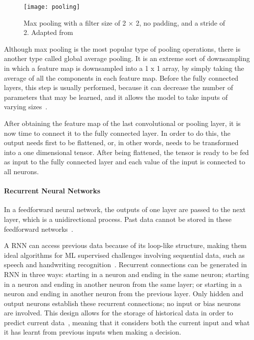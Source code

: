 \begin{figure}[htbp]
    \centering
    \texttt{[image: pooling]}
    \caption{Max pooling with a filter size of 2 × 2, no padding, and a stride of 2. Adapted from~\cite{Yamashita2018ConvolutionalRadiology}}
    \label{fig:pooling}
\end{figure}

Although max pooling is the most popular type of pooling operations, there is another type called global average pooling. It is an extreme sort of downsampling in which a feature map is downsampled into a 1 x 1 array, by simply taking the average of all the components in each feature map. Before the fully connected layers, this step is usually performed, because it can decrease the number of parameters that may be learned, and it allows the model to take inputs of varying sizes~\cite{Yamashita2018ConvolutionalRadiology}.

After obtaining the feature map of the last convolutional or pooling layer, it is now time to connect it to the fully connected layer. In order to do this, the output needs first to be flattened, or, in other words, needs to be transformed into a one dimensional tensor. After being flattened, the tensor is ready to be fed as input to the fully connected layer and each value of the input is connected to all neurons. 

\paragraph{Recurrent Neural Networks}

In a feedforward neural network, the outputs of one layer are passed to the next layer, which is a unidirectional process. Past data cannot be stored in these feedforward networks~\cite{Shewalkar2019PerformanceGRU}. 

A \gls{RNN} can access previous data because of its loop-like structure, making them ideal algorithms for \gls{ML} supervised challenges involving sequential data, such as speech and handwriting recognition~\cite{Ganatra2018ATools}. Recurrent connections can be generated in \gls{RNN} in three ways: starting in a neuron and ending in the same neuron; starting in a neuron and ending in another neuron from the same layer; or starting in a neuron and ending in another neuron from the previous layer. Only hidden and output neurons establish these recurrent connections; no input or bias neurons are involved. This design allows for the storage of historical data in order to predict current data~\cite{ShewalkarComparisonData}, meaning that it considers both the current input and what it has learnt from previous inputs when making a decision.

